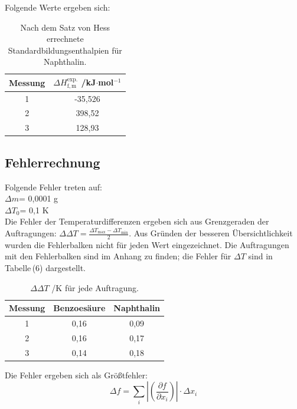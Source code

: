 \documentclass[12pt,a4paper,titlepage,headinclude,bibtotoc]{scrartcl}
\begin{document}
Folgende Werte ergeben sich:\\

\begin{table}[ht!]\centering  \caption{Nach dem Satz von Hess errechnete Standardbildungsenthalpien für Naphthalin.}
\begin{tabular}{c|c}
Messung & $\Delta H_\mathrm{f,m}^\mathrm{exp.}$ /kJ$\cdot$mol$^{-1}$\\ 
\hline
1 & -35,526\\ 
\hline 
2 & 398,52 \\ 
\hline 
3 & 128,93 \\ 
\end{tabular} 
\end{table}

\subsection{Fehlerrechnung}
Folgende Fehler treten auf:\\
 $\Delta m$= 0,0001 g\\
 $\Delta T_0$= 0,1 K\\
 
Die Fehler der Temperaturdifferenzen ergeben sich aus Grenzgeraden der Auftragungen: $\Delta \Delta T= \frac{\Delta T_\mathrm{max}-\Delta T_\mathrm{min}}{2} $. Aus Gründen der besseren Übersichtlichkeit wurden die Fehlerbalken nicht für jeden Wert eingezeichnet. Die Auftragungen mit den Fehlerbalken sind im Anhang zu finden; die Fehler für $\Delta T$ sind in Tabelle\,(6)
 dargestellt.\\

\begin{table}[ht!]\centering  \caption{$\Delta \Delta T$ /K für jede Auftragung.} \label{TabDeltaDeltaT}
\begin{tabular}{c|c|c}
Messung & Benzoesäure & Naphthalin \\ 
\hline 
1 & 0,16 & 0,09 \\ 
\hline 
2 & 0,16 & 0,17 \\ 
\hline 
3 & 0,14 & 0,18 \\ 
\end{tabular} 
\end{table}
\FloatBarrier

Die Fehler ergeben sich als Größtfehler:\\

\begin{equation}
\Delta f=\sum_i \left| \left(\frac{\partial f}{\partial x_i}\right)\right| \cdot \Delta x_i
\end{equation}
\end{document}
